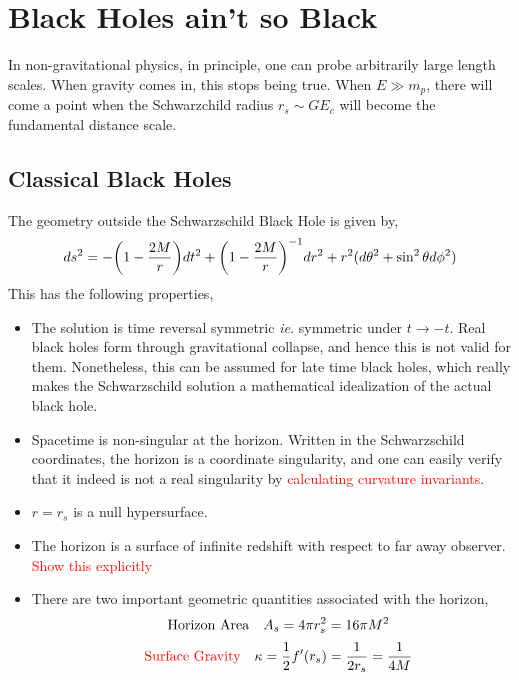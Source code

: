 \documentclass[a4paper,11pt]{article}
\newcommand{\bes}{\begin{equation*}}
\newcommand{\ees}{\end{equation*}}
\begin{document}
\section{Black Holes ain't so Black}

In non-gravitational physics, in principle, one can probe arbitrarily large length scales. When gravity comes in, this stops being true. When $ E \gg m_p $, there will come a point when the Schwarzchild radius $ r_s \sim GE_{c} $ will become the fundamental distance scale. 

\subsection{Classical Black Holes}
The geometry outside the Schwarzschild Black Hole is given by,
\bes
ds^2 = -\qty(1-\frac{2M}{r})dt^2 + \qty(1-\frac{2M}{r})^{-1} dr^2 + r^2(d\theta^2 + \sin^2 \theta d\phi^2)
\ees
This has the following properties,
\begin{itemize}
	\item The solution is time reversal symmetric \textit{ie.} symmetric under $t \rightarrow -t$. Real black holes form through gravitational collapse, and hence this is not valid for them. Nonetheless, this can be assumed for late time black holes, which really makes the Schwarzschild solution a mathematical idealization of the actual black hole.
	\item Spacetime is non-singular at the horizon. Written in the Schwarzschild coordinates, the horizon is a coordinate singularity, and one can easily verify that it indeed is not a real singularity by \textcolor{red}{calculating curvature invariants}.
	\item $ r=r_s $ is a null hypersurface.
	\item The horizon is a surface of infinite redshift with respect to far away observer. \textcolor{red}{Show this explicitly}
	\item There are two important geometric quantities associated with the horizon,
	\bes
	\qq{Horizon Area} A_s = 4\pi r_s^2 = 16 \pi M^2 
	\ees
	\bes
	\qq{\textcolor{red}{Surface Gravity}} \kappa = \frac{1}{2}f'(r_s) = \frac{1}{2r_s} = \frac{1}{4M}
	\ees
\end{itemize}
\end{document}
